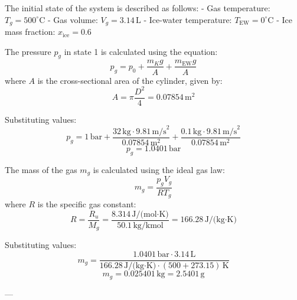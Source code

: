 The initial state of the system is described as follows:  
- Gas temperature: \( T_g = 500^\circ\text{C} \)  
- Gas volume: \( V_g = 3.14 \, \text{L} \)  
- Ice-water temperature: \( T_{\text{EW}} = 0^\circ\text{C} \)  
- Ice mass fraction: \( x_{\text{ice}} = 0.6 \)  

The pressure \( p_g \) in state 1 is calculated using the equation:  
\[
p_g = p_0 + \frac{m_K g}{A} + \frac{m_{\text{EW}} g}{A}
\]  
where \( A \) is the cross-sectional area of the cylinder, given by:  
\[
A = \pi \frac{D^2}{4} = 0.07854 \, \text{m}^2
\]  

Substituting values:  
\[
p_g = 1 \, \text{bar} + \frac{32 \, \text{kg} \cdot 9.81 \, \text{m/s}^2}{0.07854 \, \text{m}^2} + \frac{0.1 \, \text{kg} \cdot 9.81 \, \text{m/s}^2}{0.07854 \, \text{m}^2}
\]  
\[
p_g = 1.0401 \, \text{bar}
\]  

The mass of the gas \( m_g \) is calculated using the ideal gas law:  
\[
m_g = \frac{p_g V_g}{R T_g}
\]  
where \( R \) is the specific gas constant:  
\[
R = \frac{R_u}{M_g} = \frac{8.314 \, \text{J/(mol·K)}}{50.1 \, \text{kg/kmol}} = 166.28 \, \text{J/(kg·K)}
\]  

Substituting values:  
\[
m_g = \frac{1.0401 \, \text{bar} \cdot 3.14 \, \text{L}}{166.28 \, \text{J/(kg·K)} \cdot (500 + 273.15) \, \text{K}}
\]  
\[
m_g = 0.025401 \, \text{kg} = 2.5401 \, \text{g}
\]  

---